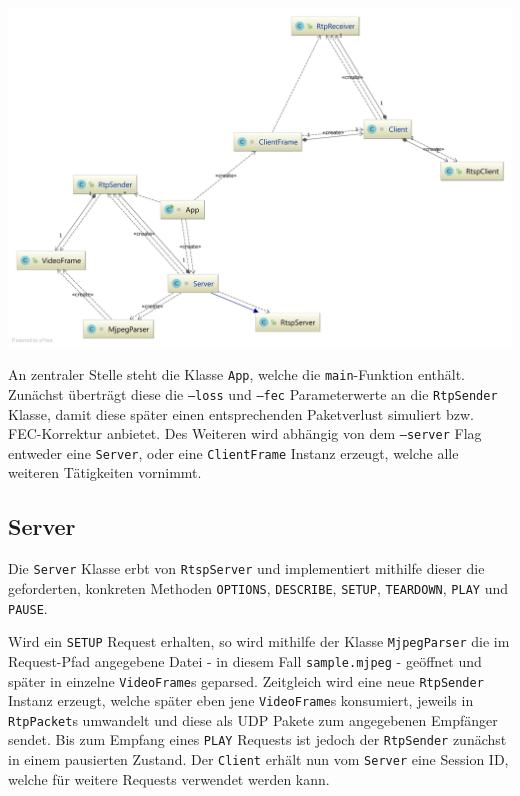 \documentclass[a4paper,12pt]{article}
\begin{document}
\includegraphics[width=\textwidth]{assets/it2.pdf}

An zentraler Stelle steht die Klasse \texttt{App}, welche die \texttt{main}-Funktion enthält.
Zunächst überträgt diese die \texttt{--loss} und \texttt{--fec} Parameterwerte an die \texttt{RtpSender} Klasse, damit diese später einen entsprechenden Paketverlust simuliert bzw. FEC-Korrektur anbietet.
Des Weiteren wird abhängig von dem \texttt{--server} Flag entweder eine \texttt{Server}, oder eine \texttt{ClientFrame} Instanz erzeugt, welche alle weiteren Tätigkeiten vornimmt.

\subsection{Server}

Die \texttt{Server} Klasse erbt von \texttt{RtspServer} und implementiert mithilfe dieser die geforderten, konkreten Methoden \texttt{OPTIONS}, \texttt{DESCRIBE}, \texttt{SETUP}, \texttt{TEARDOWN}, \texttt{PLAY} und \texttt{PAUSE}.

Wird ein \texttt{SETUP} Request erhalten, so wird mithilfe der Klasse \texttt{MjpegParser} die im Request-Pfad angegebene Datei - in diesem Fall \texttt{sample.mjpeg} - geöffnet und später in einzelne \texttt{VideoFrame}s geparsed.
Zeitgleich wird eine neue \texttt{RtpSender} Instanz erzeugt, welche später eben jene \texttt{VideoFrame}s konsumiert, jeweils in \texttt{RtpPacket}s umwandelt und diese als UDP Pakete zum angegebenen Empfänger sendet.
Bis zum Empfang eines \texttt{PLAY} Requests ist jedoch der \texttt{RtpSender} zunächst in einem pausierten Zustand.
Der \texttt{Client} erhält nun vom \texttt{Server} eine Session ID, welche für weitere Requests verwendet werden kann.
\end{document}
